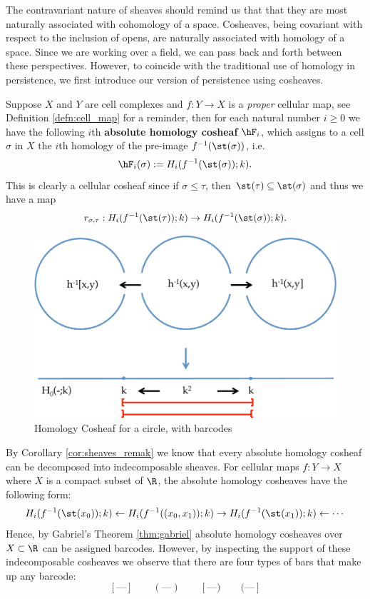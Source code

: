 The contravariant nature of sheaves should remind us that that they are most naturally associated with cohomology of a space. Cosheaves, being covariant with respect to the inclusion of opens, are naturally associated with homology of a space. Since we are working over a field, we can pass back and forth between these perspectives. However, to coincide with the traditional use of homology in persistence, we first introduce our version of persistence using cosheaves.

\begin{defn}\label{defn:abs-hom-cosheaf}
Suppose $X$ and $Y$ are cell complexes and $f:Y\to X$ is a \emph{proper} cellular map, see Definition \ref{defn:cell_map} for a reminder, then for each natural number $i\geq 0$ we have the following $i$th \textbf{absolute homology cosheaf} $\hF_i$, which assigns to a cell $\sigma$ in $X$ the $i$th homology of the pre-image $f^{-1}(\st(\sigma))$, i.e.
\[
	\hF_i(\sigma):=H_i(f^{-1}(\st(\sigma));k).
\]
This is clearly a cellular cosheaf since if $\sigma\leq \tau$, then $\st(\tau)\subseteq \st(\sigma)$ and thus we have a map 
\[
r_{\sigma,\tau}:H_i(f^{-1}(\st(\tau));k) \to H_i(f^{-1}(\st(\sigma));k).
\]
\end{defn}

\begin{figure}
\begin{center}
\includegraphics[width=\textwidth]{levelset_open_ex20pt.pdf}
\end{center}
\caption{Homology Cosheaf for a circle, with barcodes}
\label{fig:circle_bc}
\end{figure}

By Corollary \ref{cor:sheaves_remak} we know that every absolute homology cosheaf can be decomposed into indecomposable sheaves. For cellular maps $f:Y\to X$ where $X$ is a compact subset of $\R$, the absolute homology cosheaves have the following form:
\[
H_i(f^{-1}(\st(x_0));k) \leftarrow H_i(f^{-1}((x_0,x_1));k) \rightarrow H_i(f^{-1}(\st(x_1));k) \leftarrow \cdots
\]
Hence, by Gabriel's Theorem \ref{thm:gabriel} absolute homology cosheaves over $X\subset \R$ can be assigned barcodes. However, by inspecting the support of these indecomposable cosheaves we observe that there are four types of bars that make up any barcode:
\[
	[\textrm{---}] \qquad (\textrm{---}) \qquad [\textrm{---}) \qquad (\textrm{---}]
\]

